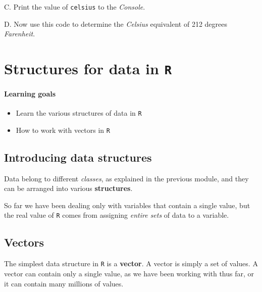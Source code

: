 \documentclass[
]{book}
\providecommand{\tightlist}{%
  \setlength{\itemsep}{0pt}\setlength{\parskip}{0pt}}
\begin{document}
C. Print the value of \texttt{celsius} to the \emph{Console}.

D. Now use this code to determine the \emph{Celsius} equivalent of 212 degrees \emph{Farenheit}.

\hypertarget{structures-for-data-in-r}{%
\chapter{\texorpdfstring{Structures for data in \texttt{R}}{Structures for data in R}}\label{structures-for-data-in-r}}

\hypertarget{learning-goals-3}{%
\subsubsection*{Learning goals}\label{learning-goals-3}}

\begin{itemize}
\tightlist
\item
  Learn the various structures of data in \texttt{R}\\
\item
  How to work with vectors in \texttt{R}
\end{itemize}

\hypertarget{introducing-data-structures}{%
\section*{Introducing data structures}\label{introducing-data-structures}}

Data belong to different \emph{classes}, as explained in the previous module, and they can be arranged into various \textbf{structures}.

So far we have been dealing only with variables that contain a single value, but the real value of \texttt{R} comes from assigning \emph{entire sets} of data to a variable.

\hypertarget{vectors}{%
\section*{Vectors}\label{vectors}}

The simplest data structure in \texttt{R} is a \textbf{vector}. A vector is simply a set of values. A vector can contain only a single value, as we have been working with thus far, or it can contain many millions of values.
\end{document}
